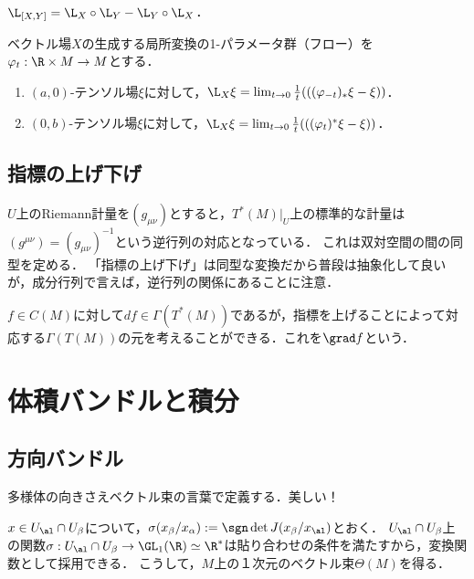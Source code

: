 \documentclass[uplatex,dvipdfmx]{jsreport}
\begin{document}
\begin{lemma}
    $\L_{[X,Y]}=\L_X\circ\L_Y-\L_Y\circ\L_X$．
\end{lemma}

\begin{theorem}[Lie微分の幾何学的特徴付け]
    ベクトル場$X$の生成する局所変換の1-パラメータ群（フロー）を$\varphi_t:\R\times M\to M$とする．
    \begin{enumerate}
        \item $(a,0)$-テンソル場$\xi$に対して，$\L_X\xi=\lim_{t\to 0}\frac{1}{t}(((\varphi_{-t})_*\xi-\xi))$．
        \item $(0,b)$-テンソル場$\xi$に対して，$\L_X\xi=\lim_{t\to 0}\frac{1}{t}(((\varphi_{t})^*\xi-\xi))$．
    \end{enumerate}
\end{theorem}

\subsection{指標の上げ下げ}

$U$上のRiemann計量を$(g_{\mu\nu})$とすると，$T^*(M)|_U$上の標準的な計量は$(g^{\mu\nu})=(g_{\mu\nu})^{-1}$という逆行列の対応となっている．
これは双対空間の間の同型を定める．
「指標の上げ下げ」は同型な変換だから普段は抽象化して良いが，成分行列で言えば，逆行列の関係にあることに注意．

$f\in C(M)$に対して$df\in\Gamma(T^*(M))$であるが，指標を上げることによって対応する$\Gamma(T(M))$の元を考えることができる．これを$\grad f$という．

\section{体積バンドルと積分}

\subsection{方向バンドル}

\begin{tcolorbox}[colframe=ForestGreen, colback=ForestGreen!10!white,breakable,colbacktitle=ForestGreen!40!white,coltitle=black,fonttitle=\bfseries\sffamily,
title=]
    多様体の向きさえベクトル束の言葉で定義する．美しい！
\end{tcolorbox}

\begin{notation}[方向バンドル]
    $x\in U_\al\cap U_\beta$について，$\sigma(x_\beta/x_\alpha):=\sgn\det J(x_\beta/x_\al)$とおく．
    $U_\al\cap U_\beta$上の関数$\sigma:U_\al\cap U_\beta\to\GL_1(\R)\simeq\R^*$は貼り合わせの条件を満たすから，変換関数として採用できる．
    こうして，$M$上の１次元のベクトル束$\Theta(M)$を得る．
\end{notation}
\end{document}
